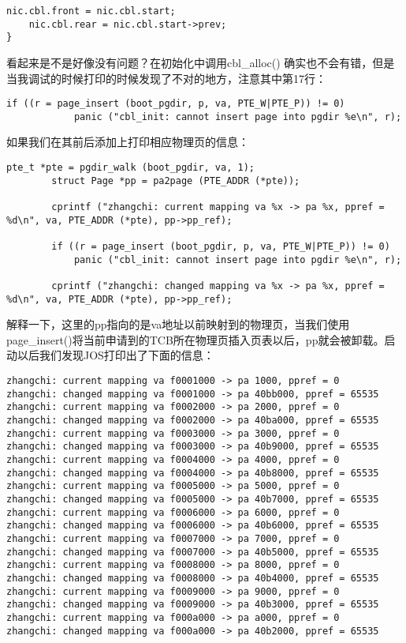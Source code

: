 \documentclass{article}
\newcommand{\funcname}[1]{{\ttfamily \small #1}}
\begin{document}
\begin{CJK*}{UTF8}{gkai}
\begin{lstlisting}[style=ccode, title={\scriptsize \ttfamily \bfseries kern/e100.c: cbl\_alloc()}]
    nic.cbl.front = nic.cbl.start;
    nic.cbl.rear = nic.cbl.start->prev;
}
\end{lstlisting}


看起来是不是好像没有问题？在初始化中调用\funcname{cbl\_alloc()} 确实也不会有错，但是当我调试的时候打印的时候发现了不对的地方，注意其中第17行：

\begin{lstlisting}[style=ccode, firstnumber=17]
        if ((r = page_insert (boot_pgdir, p, va, PTE_W|PTE_P)) != 0)
            panic ("cbl_init: cannot insert page into pgdir %e\n", r);
\end{lstlisting}

如果我们在其前后添加上打印相应物理页的信息：

\begin{lstlisting}[style=ccode, title={\scriptsize \ttfamily \bfseries kern/e100.c: cbl\_alloc()}]
        pte_t *pte = pgdir_walk (boot_pgdir, va, 1);
        struct Page *pp = pa2page (PTE_ADDR (*pte));

        cprintf ("zhangchi: current mapping va %x -> pa %x, ppref = %d\n", va, PTE_ADDR (*pte), pp->pp_ref);

        if ((r = page_insert (boot_pgdir, p, va, PTE_W|PTE_P)) != 0)
            panic ("cbl_init: cannot insert page into pgdir %e\n", r);

        cprintf ("zhangchi: changed mapping va %x -> pa %x, ppref = %d\n", va, PTE_ADDR (*pte), pp->pp_ref);
\end{lstlisting}

解释一下，这里的pp指向的是va地址以前映射到的物理页，当我们使用\funcname{page\_insert()}将当前申请到的TCB所在物理页插入页表以后，pp就会被卸载。启动以后我们发现JOS打印出了下面的信息：

\begin{lstlisting}[style=console]
zhangchi: current mapping va f0001000 -> pa 1000, ppref = 0
zhangchi: changed mapping va f0001000 -> pa 40bb000, ppref = 65535
zhangchi: current mapping va f0002000 -> pa 2000, ppref = 0
zhangchi: changed mapping va f0002000 -> pa 40ba000, ppref = 65535
zhangchi: current mapping va f0003000 -> pa 3000, ppref = 0
zhangchi: changed mapping va f0003000 -> pa 40b9000, ppref = 65535
zhangchi: current mapping va f0004000 -> pa 4000, ppref = 0
zhangchi: changed mapping va f0004000 -> pa 40b8000, ppref = 65535
zhangchi: current mapping va f0005000 -> pa 5000, ppref = 0
zhangchi: changed mapping va f0005000 -> pa 40b7000, ppref = 65535
zhangchi: current mapping va f0006000 -> pa 6000, ppref = 0
zhangchi: changed mapping va f0006000 -> pa 40b6000, ppref = 65535
zhangchi: current mapping va f0007000 -> pa 7000, ppref = 0
zhangchi: changed mapping va f0007000 -> pa 40b5000, ppref = 65535
zhangchi: current mapping va f0008000 -> pa 8000, ppref = 0
zhangchi: changed mapping va f0008000 -> pa 40b4000, ppref = 65535
zhangchi: current mapping va f0009000 -> pa 9000, ppref = 0
zhangchi: changed mapping va f0009000 -> pa 40b3000, ppref = 65535
zhangchi: current mapping va f000a000 -> pa a000, ppref = 0
zhangchi: changed mapping va f000a000 -> pa 40b2000, ppref = 65535
\end{lstlisting}


\end{CJK*}
\end{document}
